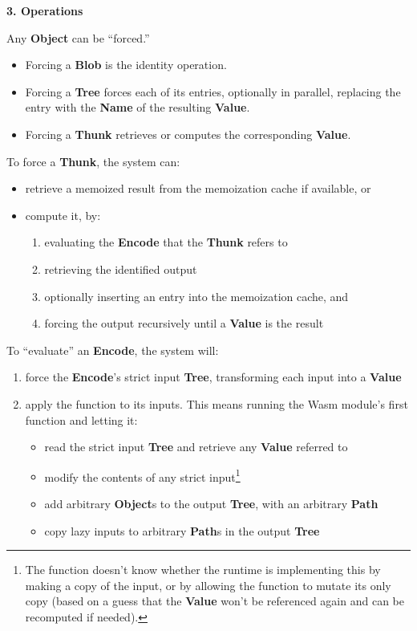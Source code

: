 \documentclass{article}
\newcommand{\blob}{\textbf{Blob}\xspace}
\newcommand{\valuex}{\textbf{Value}\xspace}
\newcommand{\object}{\textbf{Object}\xspace}
\newcommand{\objects}{\textbf{Object}s\xspace}
\newcommand{\encode}{\textbf{Encode}\xspace}
\newcommand{\thunk}{\textbf{Thunk}\xspace}
\newcommand{\name}{\textbf{Name}\xspace}
\newcommand{\tree}{\textbf{Tree}\xspace}
\newcommand{\pathx}{\textbf{Path}\xspace}
\newcommand{\pathxs}{\textbf{Path}s\xspace}
\begin{document}
\vspace{0.5\baselineskip}
{\Large \textbf{3. Operations}}

Any \object can be ``forced.''
\begin{itemize}[topsep=0pt]
\item Forcing a \blob is the identity operation.

\item Forcing a \tree forces each of its entries, optionally in
  parallel, replacing the entry with the \name of the resulting \valuex.

\item Forcing a \thunk retrieves or computes the corresponding \valuex.
\end{itemize}
  
To force a \thunk, the system can:
\begin{itemize}[topsep=0pt]
\item retrieve a memoized result from the memoization cache if available, or
\item compute it, by:
  \begin{enumerate}[topsep=0pt]
  \item evaluating the \encode that the \thunk refers to
  \item retrieving the identified output
  \item optionally inserting an entry into the memoization cache, and
  \item forcing the output recursively until a \valuex is the result
  \end{enumerate}
\end{itemize}

To ``evaluate'' an \encode, the system will:
\begin{enumerate}[topsep=0pt]
\item force the \encode's strict input \tree, transforming each input into a \valuex
\item apply the function to its inputs. This means running the Wasm module's first function and letting it:
\begin{itemize}[topsep=0pt]
\item read the strict input \tree and retrieve any \valuex referred to
\item modify the contents of any strict input\footnote{The function doesn't
  know whether the runtime is implementing this by making a copy of
  the input, or by allowing the function to mutate its only copy
  (based on a guess that the \valuex won't be referenced again
  and can be recomputed if needed).}
\item add arbitrary \objects to the output \tree, with an arbitrary \pathx
\item copy lazy inputs to arbitrary \pathxs in the output \tree
\end{itemize}
\end{enumerate}
\end{document}
